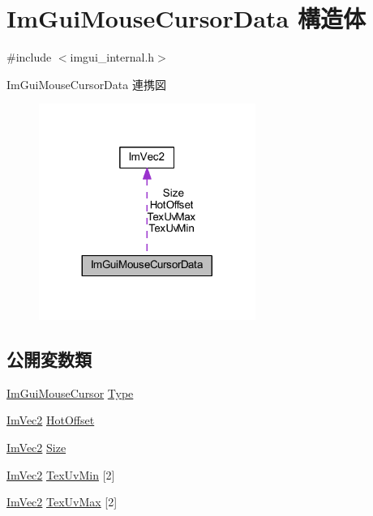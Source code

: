 \hypertarget{struct_im_gui_mouse_cursor_data}{}\section{Im\+Gui\+Mouse\+Cursor\+Data 構造体}
\label{struct_im_gui_mouse_cursor_data}


{\ttfamily \#include $<$imgui\+\_\+internal.\+h$>$}



Im\+Gui\+Mouse\+Cursor\+Data 連携図\nopagebreak
\begin{figure}[H]
\begin{center}
\leavevmode
\includegraphics[width=200pt]{struct_im_gui_mouse_cursor_data__coll__graph}
\end{center}
\end{figure}
\subsection*{公開変数類}
\begin{DoxyCompactItemize}
\item 
\mbox{\hyperlink{imgui_8h_a9223d6c82bb5d12c2eab5f829ca520ef}{Im\+Gui\+Mouse\+Cursor}} \mbox{\hyperlink{struct_im_gui_mouse_cursor_data_ab58df812a8caf8741415053515b8f347}{Type}}
\item 
\mbox{\hyperlink{struct_im_vec2}{Im\+Vec2}} \mbox{\hyperlink{struct_im_gui_mouse_cursor_data_ae271e8ec495657c2231d6e47540d3b36}{Hot\+Offset}}
\item 
\mbox{\hyperlink{struct_im_vec2}{Im\+Vec2}} \mbox{\hyperlink{struct_im_gui_mouse_cursor_data_af8dd3ec3de77811d6caf4bfdde085495}{Size}}
\item 
\mbox{\hyperlink{struct_im_vec2}{Im\+Vec2}} \mbox{\hyperlink{struct_im_gui_mouse_cursor_data_add35adb991fcfd03ae33c3607aa0c842}{Tex\+Uv\+Min}} \mbox{[}2\mbox{]}
\item 
\mbox{\hyperlink{struct_im_vec2}{Im\+Vec2}} \mbox{\hyperlink{struct_im_gui_mouse_cursor_data_a30bae90a9e61608c4fd9fe03b5f7390f}{Tex\+Uv\+Max}} \mbox{[}2\mbox{]}
\end{DoxyCompactItemize}



